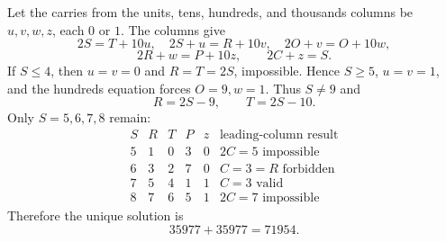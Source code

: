 Let the carries from the units, tens, hundreds, and thousands columns be $u,v,w,z$, each $0$ or $1$. The columns give
\[
2S=T+10u,\quad2S+u=R+10v,\quad
2O+v=O+10w,
\]
\[
2R+w=P+10z,\qquad2C+z=S.
\]
If $S\le4$, then $u=v=0$ and $R=T=2S$, impossible. Hence $S\ge5$, $u=v=1$, and the hundreds equation forces $O=9,w=1$. Thus $S\ne9$ and
\[
R=2S-9,\qquad T=2S-10.
\]
Only $S=5,6,7,8$ remain:
\[
\begin{array}{c|c|c|c|c|l}
S&R&T&P&z&\text{leading-column result}\\ \hline
5&1&0&3&0&2C=5\text{ impossible}\\
6&3&2&7&0&C=3=R\text{ forbidden}\\
7&5&4&1&1&C=3\text{ valid}\\
8&7&6&5&1&2C=7\text{ impossible}
\end{array}
\]
Therefore the unique solution is
\[
\boxed{35977+35977=71954}.
\]
